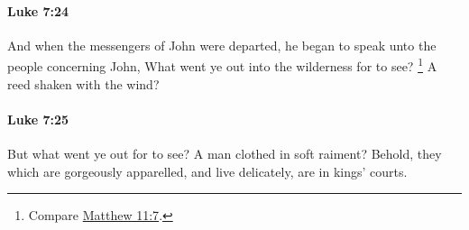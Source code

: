 		\paragraph{Luke 7:24} %
			\label{LUKE-7-24}

			And when the messengers of John were departed, he began to speak unto the people concerning John, What went ye out into the wilderness for to see?
				\footnote{%
					Compare \hyperref[MATTHEW-11-7]{Matthew 11:7}.
					}%
			A reed shaken with the wind?

			\begin{framed}
			\scriptsize
				\begin{compactdesc}
					\item[SBLG] 
				\end{compactdesc}
			\end{framed}

		\paragraph{Luke 7:25} %
			\label{LUKE-7-25}

			But what went ye out for to see? A man clothed in soft raiment? Behold, they which are gorgeously apparelled, and live delicately, are in kings' courts.

